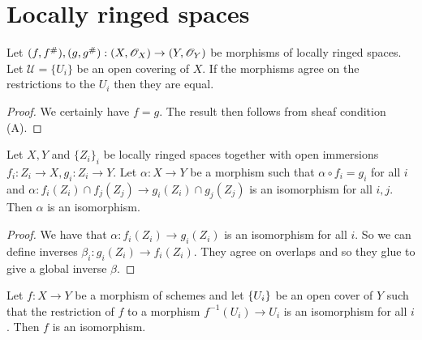 \documentclass{memoir}
\begin{document}
\section{Locally ringed spaces}
\begin{lemma}
    Let $(f,f^\#),(g,g^\#):(X,\mathscr{O}_X)\to (Y,\mathscr{O}_Y)$ be morphisms of locally ringed spaces.
    Let $\mathcal U = \{U_i\}$ be an open covering of $X$.
    If the morphisms agree on the restrictions to the $U_i$ then they are equal.
\end{lemma}
\begin{proof}
    We certainly have $f = g$.
    The result then follows from sheaf condition (A).
\end{proof}
\begin{proposition}
    Let $X, Y$ and $\{Z_i\}_i$ be locally ringed spaces together with open immersions $f_i:Z_i\to X, g_i:Z_i\to Y$.
    Let $\alpha:X\to Y$ be a morphism such that $\alpha\circ f_i = g_i$ for all $i$ and $\alpha:f_i(Z_i)\cap f_j(Z_j) \to g_i(Z_i)\cap g_j(Z_j)$ is an isomorphism for all $i,j$.
    Then $\alpha$ is an isomorphism.
\end{proposition}
\begin{proof}
    We have that $\alpha:f_i(Z_i)\to g_i(Z_i)$ is an isomorphism for all $i$.
    So we can define inverses $\beta_i:g_i(Z_i)\to f_i(Z_i)$.
    They agree on overlaps and so they glue to give a global inverse $\beta$.
\end{proof}
\begin{proposition}
    Let $f:X\to Y$ be a morphism of schemes and let $\lbrace U_i\rbrace$ be an open cover of $Y$ such that the restriction of $f$ to a morphism $f^{-1}(U_i) \to U_i$ is an isomorphism for all $i$.
    Then $f$ is an isomorphism.
\end{proposition}
\end{document}
